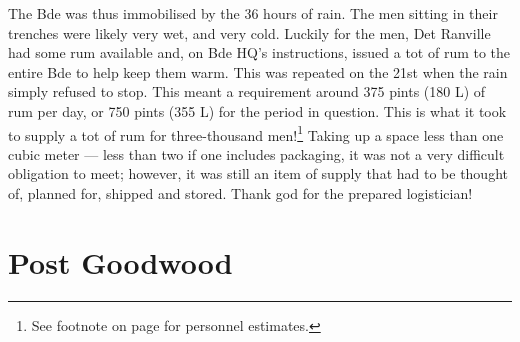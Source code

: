 \documentclass[noraggedright]{turabian-researchpaper}
\begin{document}
The Bde was thus immobilised by the 36 hours of rain.  The men sitting in their
trenches were likely very wet, and very cold. Luckily for the men, Det Ranville
had some rum available and, on Bde HQ's instructions, issued a tot of rum to 
the entire Bde to help keep them warm.  This was repeated on the 21st when 
the rain simply refused to stop.\autocite[20-1 July 1944]{90wd}  This meant
a requirement around 375 pints (180 L) of rum per day, or 750 pints (355 L)
for the period in question.  This is what it took to supply a tot of rum for 
three-thousand men!\footnote{See footnote  on page 
\pageref{manpower} for personnel estimates.}  Taking up a space less than one 
cubic meter --- less than two if one includes packaging, it was not a very 
difficult obligation to meet; however, it was still an item of supply that 
had to be thought of, planned for, shipped and stored. Thank god for the 
prepared logistician! 

\section{Post Goodwood}


\end{document}
